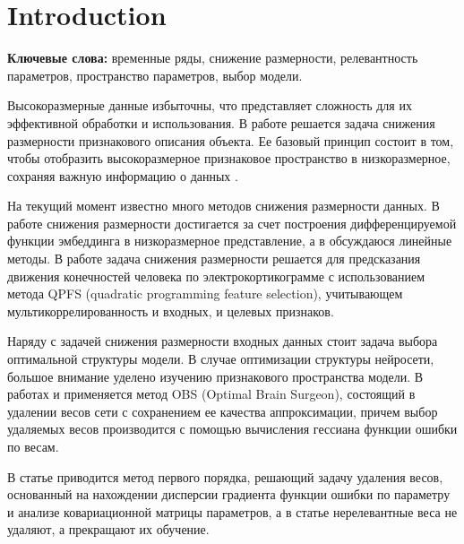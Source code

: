 \documentclass[12pt, twoside]{article}
\begin{document}


\section{Introduction}
\textbf{Ключевые слова:} временные ряды, снижение размерности, релевантность параметров, пространство параметров, выбор модели.






Высокоразмерные данные избыточны, что представляет сложность для их эффективной обработки и использования. В работе решается задача снижения размерности признакового описания объекта.
Ее базовый принцип состоит в том, чтобы отобразить высокоразмерное признаковое пространство в низкоразмерное, сохраняя важную информацию о данных \citep{jia2022feature}.

На текущий момент известно много методов снижения размерности данных. В работе \citep{ornek2019nonlinear} снижения размерности достигается за счет построения дифференцируемой функции эмбеддинга в низкоразмерное представление, а в \citep{cunningham2014dimensionality} обсуждаюся линейные методы. В работе \citep{isachenko2022quadratic} задача снижения размерности решается для предсказания движения конечностей человека по электрокортикограмме с использованием  метода QPFS (quadratic programming feature selection), учитывающем мультикоррелированность и входных, и целевых признаков.

Наряду с задачей снижения размерности входных данных стоит задача выбора оптимальной структуры модели. В случае оптимизации структуры нейросети, большое внимание уделено изучению признакового пространства модели. В работах \citep{hassibi1993optimal} и \citep{dong2017learning} применяется метод OBS (Optimal Brain Surgeon), состоящий в удалении весов сети с сохранением ее качества аппроксимации, причем выбор удаляемых весов производится с помощью вычисления гессиана функции ошибки по весам.

В статье \citep{grabovoy2019def} приводится метод первого порядка, решающий задачу удаления весов, основанный на нахождении дисперсии градиента функции ошибки по параметру и анализе ковариационной матрицы параметров, а в статье \cite{grabovoy2020intro} нерелевантные веса не удаляют, а прекращают их обучение.
\end{document}
